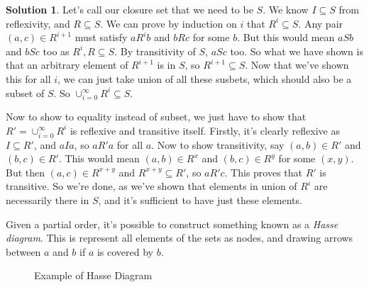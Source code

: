 \documentclass[a4paper,10pt]{article}
\theoremstyle{definition} %
\newtheorem*{solution}{Solution}
\begin{document}
    \begin{solution}
        Let's call our closure set that we need to be $S$. We know $I \subseteq S$ from reflexivity, and $R \subseteq S$.
        We can prove by induction on $i$ that $R^i \subseteq S$. Any pair $(a,c) \in R^{i+1}$ must satisfy $aR^ib$ and $bRc$
        for some $b$. But this would mean $aSb$ and $bSc$ too as $R^i, R \subseteq S$. By transitivity of $S$, $aSc$ too. So 
        what we have shown is that an arbitrary element of $R^{i+1}$ is in $S$, so $R^{i+1} \subseteq S$.
        Now that we've shown this for all $i$, we can just take union of all these susbets, which should also be a subset of $S$.
        So $\cup_{i=0}^{\infty} R^i \subseteq S$.

        Now to show to equality instead of subset, we just have to show that $R' = \cup_{i=0}^{\infty} R^i$ is reflexive and transitive 
        itself. Firstly, it's clearly reflexive as $I \subseteq R'$, and $aIa$, so $aR'a$ for all $a$. Now to show transitivity, say 
        $(a,b) \in R'$ and $(b,c) \in R'$. This would mean $(a,b) \in R^x$ and $(b,c) \in R^y$ for some $(x,y)$. But then $(a,c) \in R^{x+y}$
        and $R^{x+y} \subseteq R'$, so $aR'c$. This proves that $R'$ is transitive. So we're done, as we've shown that elements in union of $R^i$
        are necessarily there in $S$, and it's sufficient to have just these elements.
    \end{solution}

    Given a partial order, it's possible to construct something known as a \emph{Hasse diagram}. This is represent all elements of the sets as nodes,
    and drawing arrows between $a$ and $b$ if $a$ is covered by $b$.

    \begin{figure}[H]
        \centering
        \caption{Example of Hasse Diagram}
    \end{figure}
    
\end{document}

